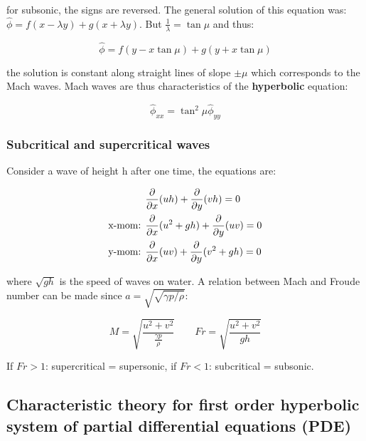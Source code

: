 	for subsonic, the signs are reversed. The general solution of this equation was: $\hat{\phi} = f(x-\lambda y) + g(x+\lambda y)$. But $\frac{1}{\lambda} = \tan \mu$ and thus: 
	
	\begin{equation}
	\hat{\phi} = f(y - x\tan \mu) + g(y + x \tan \mu)
	\end{equation}
	
	the solution is constant along straight lines of slope $\pm \mu$ which corresponds to the Mach waves. Mach waves are thus characteristics of the \textbf{hyperbolic} equation: 
	
	\begin{equation}
	\hat{\phi} _{xx} = \tan^2 \mu \hat{\phi} _{yy} 
	\end{equation}
	
\subsubsection{Subcritical and supercritical waves}
	Consider a wave of height h after one time, the equations are: 
	
	\begin{equation}
	\begin{aligned}
	&\frac{\partial }{\partial x} (uh) + \frac{\partial}{\partial y} (vh) = 0\\
	\mbox{x-mom: } &\frac{\partial}{\partial x } (u^2 + gh) + \frac{\partial}{\partial y} (uv) = 0\\
	\mbox{y-mom: } &\frac{\partial}{\partial x } (uv) + \frac{\partial}{\partial y} (v^2 + gh) = 0
	\end{aligned}
	\end{equation}
	
	where $\sqrt{gh}$ is the speed of waves on water. A relation between Mach and Froude number can be made since $a = \sqrt{\sqrt{\gamma p /\rho}}$: 
	
	\begin{equation}
	M = \sqrt{\frac{u^2 + v^2}{\frac{\gamma p}{\rho}}} \qquad Fr = \sqrt{\frac{u^2 + v^2}{gh}}
	\end{equation}
	
	If $Fr > 1$: supercritical = supersonic, if $Fr < 1$: subcritical = subsonic. 
	
\subsection{Characteristic theory for first order hyperbolic system of partial differential equations (PDE)}

